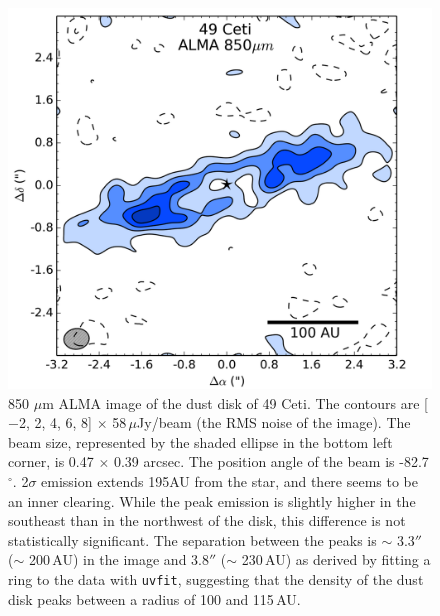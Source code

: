\begin{figure}[ht]
\centering
\includegraphics[width = 1\textwidth]{49CET_ALMA_square.png}
\caption{850 $\mu$m ALMA image of the dust disk of 49 Ceti. The contours are [$-$2, 2, 4, 6, 8] $\times$ 58\,$\mu$Jy/beam (the RMS noise of the image). The beam size, represented by the shaded ellipse in the bottom left corner, is 0.47 $\times$ 0.39 arcsec. The position angle of the beam is -82.7$^{\circ}$. 2$\sigma$ emission extends 195AU from the star, and there seems to be an inner clearing. While the peak emission is slightly higher in the southeast than in the northwest of the disk, this difference is not statistically significant. The separation between the peaks is $\sim$ 3.3$''$ ($\sim$ 200\,AU) in the image and 3.8$''$ ($\sim$ 230\,AU) as derived by fitting a ring to the data with \texttt{uvfit}, suggesting that the density of the dust disk peaks between a radius of 100 and 115\,AU.} 
\label{fig:49CET_image}
\end{figure}




